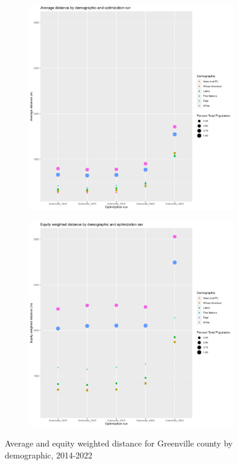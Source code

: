 \documentclass[11pt]{article}
\theoremstyle{remark}
\theoremstyle{definition}
\begin{document}
\begin{figure}
	\begin{subfigure}{.8\textwidth}
		\centering
		\includegraphics[width=.8\linewidth]{result_analysis/Greenville_County_SC_original_configs/orig_pop_scaled_avg}
		\label{sfig:Greenville avg dist}
	\end{subfigure} \newline
	\begin{subfigure}{.8\textwidth}
		\centering
		\includegraphics[width=.8\linewidth]{result_analysis/Greenville_County_SC_original_configs/orig_pop_scaled_y_EDE}
		\label{sfig:Greenville equity dist}
	\end{subfigure}
	\caption{Average and equity weighted distance for Greenville county by demographic, 2014-2022}
	\label{fig:Greenville distance graphs}
\end{figure}
\end{document}
